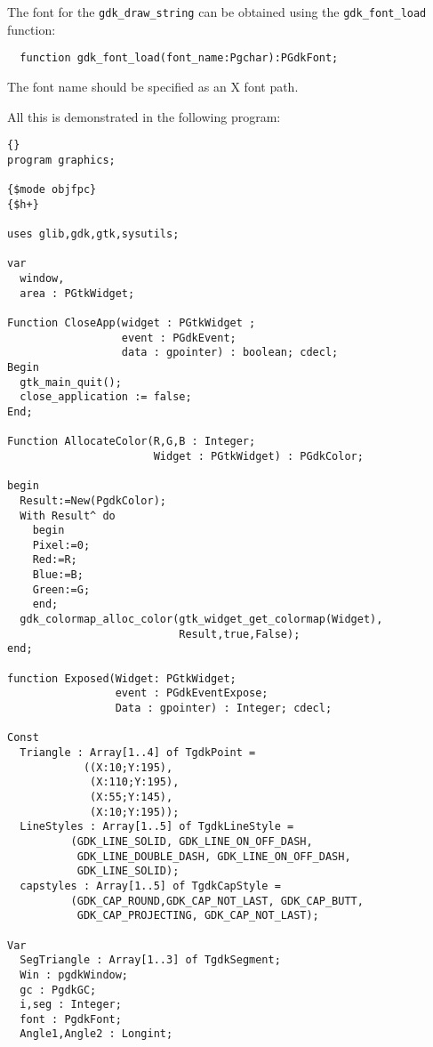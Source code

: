 \documentclass[10pt]{article}
\newcommand{\var}[1]{\texttt{#1}}
\begin{document}
The font for the \var{gdk\_draw\_string} can be obtained using the
\var{gdk\_font\_load} function:
\begin{verbatim}
  function gdk_font_load(font_name:Pgchar):PGdkFont;
\end{verbatim}
The font name should be specified as an X font path.

All this is demonstrated in the following program:
\begin{lstlisting}{}
program graphics;

{$mode objfpc}
{$h+}

uses glib,gdk,gtk,sysutils;

var 
  window, 
  area : PGtkWidget;

Function CloseApp(widget : PGtkWidget ;
                  event : PGdkEvent;
                  data : gpointer) : boolean; cdecl;
Begin
  gtk_main_quit();
  close_application := false;
End;

Function AllocateColor(R,G,B : Integer; 
                       Widget : PGtkWidget) : PGdkColor;

begin
  Result:=New(PgdkColor);
  With Result^ do
    begin
    Pixel:=0;
    Red:=R;
    Blue:=B;
    Green:=G;  
    end;
  gdk_colormap_alloc_color(gtk_widget_get_colormap(Widget),
                           Result,true,False);
end;

function Exposed(Widget: PGtkWidget;
                 event : PGdkEventExpose; 
                 Data : gpointer) : Integer; cdecl;

Const 
  Triangle : Array[1..4] of TgdkPoint = 
            ((X:10;Y:195),
             (X:110;Y:195),
             (X:55;Y:145),
             (X:10;Y:195));
  LineStyles : Array[1..5] of TgdkLineStyle = 
          (GDK_LINE_SOLID, GDK_LINE_ON_OFF_DASH, 
           GDK_LINE_DOUBLE_DASH, GDK_LINE_ON_OFF_DASH, 
           GDK_LINE_SOLID);
  capstyles : Array[1..5] of TgdkCapStyle = 
          (GDK_CAP_ROUND,GDK_CAP_NOT_LAST, GDK_CAP_BUTT,  
           GDK_CAP_PROJECTING, GDK_CAP_NOT_LAST);
          
Var
  SegTriangle : Array[1..3] of TgdkSegment;
  Win : pgdkWindow;
  gc : PgdkGC;
  i,seg : Integer; 
  font : PgdkFont;
  Angle1,Angle2 : Longint;
    

\end{lstlisting}
\end{document}
